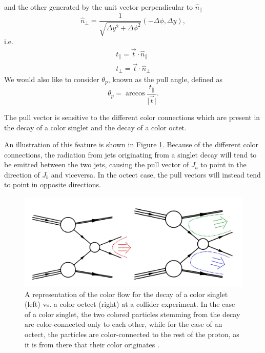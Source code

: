 \documentclass[10pt,a4paper]{book}
\begin{document}
and the other generated by the unit vector perpendicular to $\hat{n}_\parallel$
\begin{equation}
\hat{n}_\perp = \frac{1}{\sqrt{\Delta y^2 + \Delta \phi^2}}\left(-\Delta \phi, \Delta y \right),
\end{equation}
i.e.
\begin{gather}
t_\parallel = \vec{t}\cdot \hat{n}_\parallel \\
t_\perp = \vec{t}\cdot \hat{n}_\perp
\end{gather}
We would also like to consider $\theta_{p}$, known as the pull angle, defined as
\begin{equation}
\theta_p = \arccos \frac{t_\parallel}{\vert \vec{t} \vert}.
\end{equation} 

The pull vector is sensitive to the different color connections which are present in the decay of a color singlet and the decay of a color octet.

 An illustration of this feature is shown in Figure \ref{color connections}. Because of the different color connections, the radiation from jets originating from a singlet decay will tend to be emitted between the two jets, causing the pull vector of $J_a$ to point in the direction of $J_b$ and viceversa. In the octect case, the pull vectors will instead tend to point in opposite directions.
\begin{figure}[ht]
\centering
\includegraphics[scale=0.2]{ch4_images/color_configurations}
\caption{A representation of the color flow for the decay of a color singlet (left) vs. a color octect (right) at a collider experiment. In the case of a color singlet, the two colored particles stemming from the decay are color-connected only to each other, while for the case of an octect, the particles are color-connected to the rest of the proton, as it is from there that their color originates \cite{Gallicchio:2010sw}.}
\label{color connections}
\end{figure}
\end{document}
